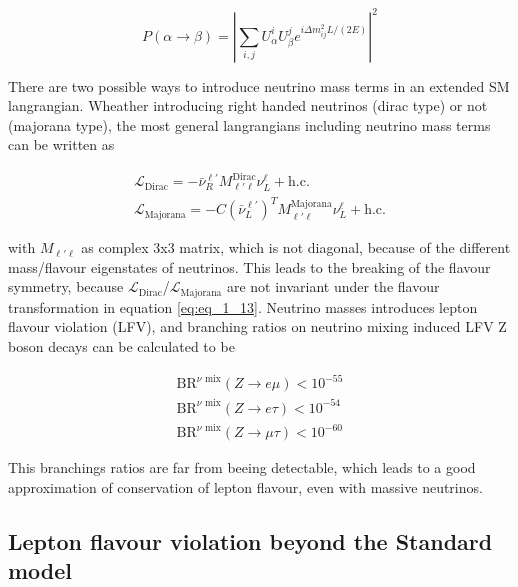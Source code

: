 \begin{equation}
	\label{eq:eq_1_14}
	P(\alpha \rightarrow \beta) = |\sum_{i, j} U_{\alpha}^{i} U_{\beta}^{j} e^{i\Delta m^2_{ij}L/(2E)}|^2
\end{equation}

There are two possible ways to introduce neutrino mass terms in an extended \acs{SM} langrangian. Wheather introducing right handed neutrinos (dirac type) or not (majorana type), the most general langrangians including neutrino mass terms \cite{NEUTRINOMASS} can be written as 

\begin{equation}
	\label{eq:eq_1_15}
	\begin{split}
		\mathcal{L}_{\text{Dirac}} = -\bar{\nu}^{\ell'}_{R}M^{\text{Dirac}}_{\ell'\ell} \nu^{\ell}_{L} + \text{h.c.} \\
		\mathcal{L}_{\text{Majorana}} = -C(\bar{\nu}^{\ell'}_{L})^{T}M^{\text{Majorana}}_{\ell'\ell} \nu^{\ell}_{L} + \text{h.c.} 
	\end{split}
\end{equation}

with $M_{\ell'\ell}$ as complex 3x3 matrix, which is not diagonal, because of the different mass/flavour eigenstates of neutrinos. This leads to the breaking of the flavour symmetry, because $\mathcal{L}_{\text{Dirac}}$/$\mathcal{L}_{\text{Majorana}}$ are not invariant under the flavour transformation in equation \ref{eq:eq_1_13}. Neutrino masses introduces lepton flavour violation (\acs{LFV}), and branching ratios on neutrino mixing induced \acs{LFV} Z boson decays \cite{NEUTRINOLFV} can be calculated to be 

\begin{equation}
	\label{eq:eq_1_16}
	\begin{split}
		\text{BR}^{\nu \text{ mix}}(Z\to e\mu) < 10^{-55} \\
		\text{BR}^{\nu \text{ mix}}(Z\to e\tau) < 10^{-54} \\
		\text{BR}^{\nu \text{ mix}}(Z\to \mu\tau) < 10^{-60}
	\end{split}
\end{equation}

This branchings ratios are far from beeing detectable, which leads to a good approximation of conservation of lepton flavour, even with massive neutrinos.

\subsection{Lepton flavour violation beyond the Standard model}
\label{sec:section_1_3_3}

